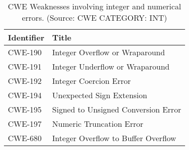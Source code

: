 \begin{table}[!h]
	\centering
	\caption{CWE Weaknesses involving integer and numerical errors. (Source: CWE CATEGORY: INT)}
	\label{table:cwe_integers}
	\begin{tabular}{ll}
		\toprule
			\textbf{Identifier} & \textbf{Title}\\
		\midrule
			CWE-190 & Integer Overflow or Wraparound\\
			CWE-191 & Integer Underflow or Wraparound\\
			CWE-192 & Integer Coercion Error\\
			CWE-194 & Unexpected Sign Extension\\
			CWE-195 & Signed to Unsigned Conversion Error\\
			CWE-197 & Numeric Truncation Error\\
			CWE-680 & Integer Overflow to Buffer Overflow\\
		\bottomrule
	\end{tabular}
\end{table}